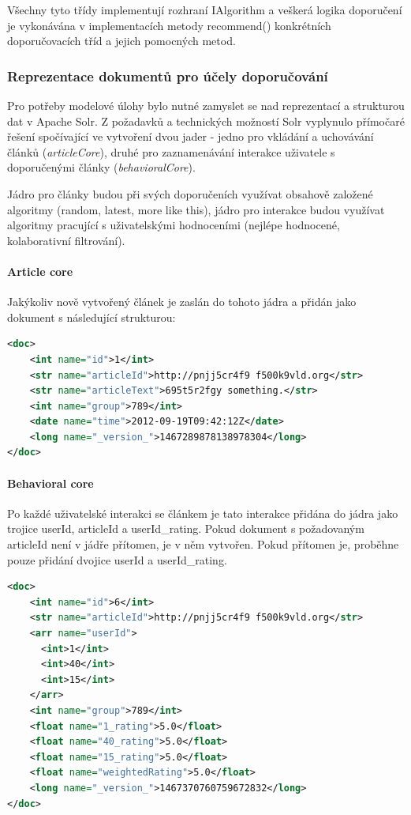 \documentclass[thesis=M,czech]{FITthesis}[2014/05/07]
\begin{document}
Všechny tyto třídy implementují rozhraní IAlgorithm a veškerá logika doporučení je vykonávána v implementacích metody recommend() konkrétních doporučovacích tříd a jejich pomocných metod. 

\subsubsection{Reprezentace dokumentů pro účely doporučování}

Pro potřeby modelové úlohy bylo nutné zamyslet se nad reprezentací a strukturou dat v Apache Solr. Z požadavků a technických možností Solr vyplynulo přímočaré řešení spočívající ve vytvoření dvou jader - jedno pro vkládání a uchovávání článků (\emph{articleCore}), druhé pro zaznamenávání interakce uživatele s doporučenými články (\emph{behavioralCore}). 

Jádro pro články budou při svých doporučeních využívat obsahově založené algoritmy (random, latest, more like this), jádro pro interakce budou využívat algoritmy pracující s uživatelskými hodnoceními (nejlépe hodnocené, kolaborativní filtrování).

\paragraph{Article core}
Jakýkoliv nově vytvořený článek je zaslán do tohoto jádra a přidán jako dokument s následující strukturou:

\begin{lstlisting}[language=xml]
 <doc>
    <int name="id">1</int>
    <str name="articleId">http://pnjj5cr4f9 f500k9vld.org</str>
    <str name="articleText">695t5r2fgy something.</str>
    <int name="group">789</int>
    <date name="time">2012-09-19T09:42:12Z</date>
    <long name="_version_">1467289878138978304</long>
</doc>
\end{lstlisting}

\paragraph{Behavioral core}
Po každé uživatelské interakci se článkem je tato interakce přidána do jádra jako trojice userId, articleId a userId\_rating. Pokud dokument s požadovaným articleId není v jádře přítomen, je v něm vytvořen. Pokud přítomen je, proběhne pouze přidání dvojice userId a userId\_rating.

\begin{lstlisting}[language=xml]
<doc>
    <int name="id">6</int>
    <str name="articleId">http://pnjj5cr4f9 f500k9vld.org</str>
    <arr name="userId">
      <int>1</int>
      <int>40</int>      
      <int>15</int>      
    </arr>
    <int name="group">789</int>
    <float name="1_rating">5.0</float>
    <float name="40_rating">5.0</float>
    <float name="15_rating">5.0</float>        
    <float name="weightedRating">5.0</float>
    <long name="_version_">1467370760759672832</long>
</doc>
\end{lstlisting}
\end{document}
